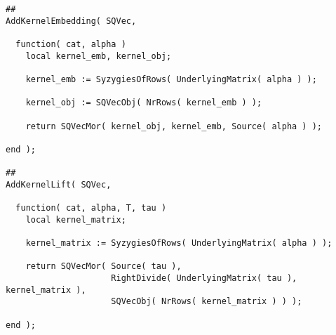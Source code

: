\begin{small}
\begin{Verbatim}[frame=single]
##
AddKernelEmbedding( SQVec,

  function( cat, alpha )
    local kernel_emb, kernel_obj;
    
    kernel_emb := SyzygiesOfRows( UnderlyingMatrix( alpha ) );
    
    kernel_obj := SQVecObj( NrRows( kernel_emb ) );
    
    return SQVecMor( kernel_obj, kernel_emb, Source( alpha ) );
    
end );

##
AddKernelLift( SQVec,

  function( cat, alpha, T, tau )
    local kernel_matrix;
    
    kernel_matrix := SyzygiesOfRows( UnderlyingMatrix( alpha ) );

    return SQVecMor( Source( tau ),
                     RightDivide( UnderlyingMatrix( tau ), kernel_matrix ),
                     SQVecObj( NrRows( kernel_matrix ) ) );
    
end );
\end{Verbatim}
\end{small}
